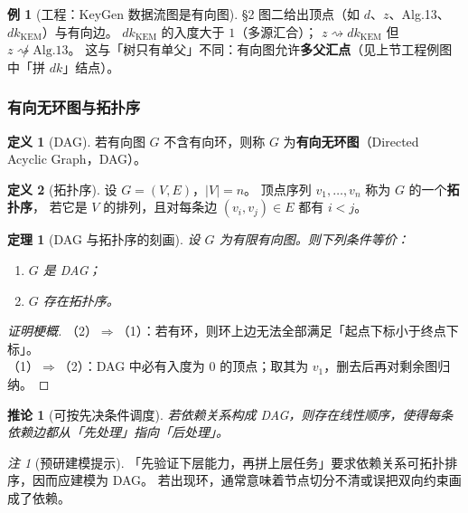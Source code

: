 \documentclass[UTF8,a4paper,11pt]{ctexart}
\theoremstyle{definition}
\newtheorem{definition}{定义}[section]
\newtheorem{example}{例}[section]
\theoremstyle{plain}
\newtheorem{theorem}{定理}[section]
\newtheorem{corollary}{推论}[section]
\theoremstyle{remark}
\newtheorem{remark}{注}[section]
\numberwithin{figure}{section}
\numberwithin{table}{section}
\begin{document}
\begin{example}[工程：KeyGen 数据流图是有向图]
§2 图二给出顶点（如 $d$、$z$、Alg.13、$\mathit{dk}_{\mathrm{KEM}}$）与有向边。
$\mathit{dk}_{\mathrm{KEM}}$ 的入度大于 $1$（多源汇合）；
$z\rightsquigarrow \mathit{dk}_{\mathrm{KEM}}$ 但 $z\not\rightsquigarrow \text{Alg.13}$。
这与「树只有单父」不同：有向图允许\textbf{多父汇点}（见上节工程例图中「拼 $\mathit{dk}$」结点）。
\end{example}

\subsubsection{有向无环图与拓扑序}
\label{sec:dag-topo}

\begin{definition}[DAG]
若有向图 $G$ 不含有向环，则称 $G$ 为\textbf{有向无环图}（Directed Acyclic Graph，DAG）。
\end{definition}

\begin{definition}[拓扑序]
设 $G=(V,E)$，$|V|=n$。
顶点序列 $v_1,\ldots,v_n$ 称为 $G$ 的一个\textbf{拓扑序}，
若它是 $V$ 的排列，且对每条边 $(v_i,v_j)\in E$ 都有 $i<j$。
\end{definition}

\begin{theorem}[DAG 与拓扑序的刻画]
设 $G$ 为有限有向图。则下列条件等价：
\begin{enumerate}
  \item $G$ 是 DAG；
  \item $G$ 存在拓扑序。
\end{enumerate}
\end{theorem}
\begin{proof}[证明梗概]
（2）${\Rightarrow}$（1）：若有环，则环上边无法全部满足「起点下标小于终点下标」。\\
（1）${\Rightarrow}$（2）：DAG 中必有入度为 $0$ 的顶点；取其为 $v_1$，删去后再对剩余图归纳。
\end{proof}

\begin{corollary}[可按先决条件调度]
若依赖关系构成 DAG，则存在线性顺序，使得每条依赖边都从「先处理」指向「后处理」。
\end{corollary}

\begin{remark}[预研建模提示]
「先验证下层能力，再拼上层任务」要求依赖关系可拓扑排序，因而应建模为 DAG。
若出现环，通常意味着节点切分不清或误把双向约束画成了依赖。
\end{remark}
\end{document}
